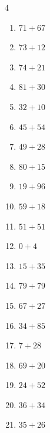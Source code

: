 \begin{multicols}{4}
\begin{enumerate}
  \item $71+67$
        \phantom{$=138$}

\columnbreak %

  \item $73+12$
        \phantom{$=85$}

  \item $74+21$
        \phantom{$=95$}

  \item $81+30$
        \phantom{$=111$}

  \item $32+10$
        \phantom{$=42$}

  \item $45+54$
        \phantom{$=99$}

  \item $49+28$
        \phantom{$=77$}

  \item $80+15$
        \phantom{$=95$}

  \item $19+96$
        \phantom{$=115$}

  \item $59+18$
        \phantom{$=77$}

  \item $51+51$
        \phantom{$=102$}

  \item $0+4$
        \phantom{$=4$}

  \item $15+35$
        \phantom{$=50$}

  \item $79+79$
        \phantom{$=158$}

  \item $67+27$
        \phantom{$=94$}

  \item $34+85$
        \phantom{$=119$}

  \item $7+28$
        \phantom{$=35$}

  \item $69+20$
        \phantom{$=89$}

  \item $24+52$
        \phantom{$=76$}

  \item $36+34$
        \phantom{$=70$}

  \item $35+26$
        \phantom{$=61$}


\end{enumerate}
\end{multicols}
